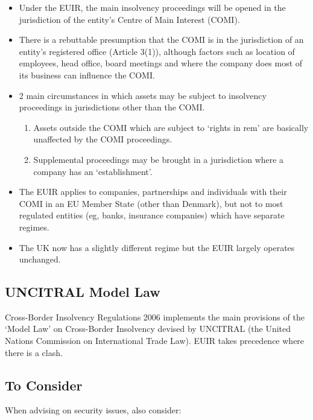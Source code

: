 \documentclass[
]{article}
\providecommand{\tightlist}{%
  \setlength{\itemsep}{0pt}\setlength{\parskip}{0pt}}
\begin{document}
\begin{itemize}
\tightlist
\item
  Under the EUIR, the main insolvency proceedings will be opened in the
  jurisdiction of the entity's Centre of Main Interest (COMI).
\item
  There is a rebuttable presumption that the COMI is in the jurisdiction
  of an entity's registered office (Article 3(1)), although factors such
  as location of employees, head office, board meetings and where the
  company does most of its business can influence the COMI.
\item
  2 main circumstances in which assets may be subject to insolvency
  proceedings in jurisdictions other than the COMI.

  \begin{enumerate}
  \tightlist
  \item
    Assets outside the COMI which are subject to `rights in rem' are
    basically unaffected by the COMI proceedings.
  \item
    Supplemental proceedings may be brought in a jurisdiction where a
    company has an `establishment'.
  \end{enumerate}
\item
  The EUIR applies to companies, partnerships and individuals with their
  COMI in an EU Member State (other than Denmark), but not to most
  regulated entities (eg, banks, insurance companies) which have
  separate regimes.
\item
  The UK now has a slightly different regime but the EUIR largely
  operates unchanged.
\end{itemize}

\hypertarget{uncitral-model-law}{%
\subsection{UNCITRAL Model Law}\label{uncitral-model-law}}

Cross-Border Insolvency Regulations 2006 implements the main provisions
of the `Model Law' on Cross-Border Insolvency devised by UNCITRAL (the
United Nations Commission on International Trade Law). EUIR takes
precedence where there is a clash.

\hypertarget{to-consider}{%
\subsection{To Consider}\label{to-consider}}

When advising on security issues, also consider:
\end{document}
